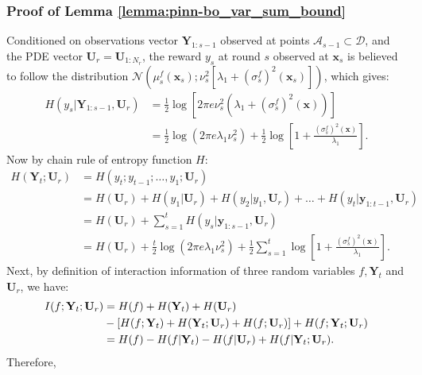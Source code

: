 \subsubsection{Proof of Lemma \ref{lemma:pinn-bo_var_sum_bound}}
Conditioned on observations vector $\mathbf{Y}_{1:s-1}$  observed at points $\mathcal{A}_{s-1} \subset \mathcal{D}$, and the PDE vector $\mathbf{U}_r = \mathbf{U}_{1:N_r}$, the reward $y_s$ at round $s$ observed at
$\mathbf{x}_s$ is believed to follow the distribution $\mathcal{N}\left(\mu_s^f(\mathbf{x}_s); \nu_s^2[\lambda_1 + \left(\sigma_s^f\right)^2(\mathbf{x}_s)]\right)$, which gives:
\begin{align*}
H(y_s \rvert \mathbf{Y}_{1:s-1}, \mathbf{U}_r) &= \frac{1}{2} \log\left[ 2\pi e \nu_s^2\left(\lambda_1 + \left(\sigma_s^f\right)^2(\mathbf{x}) \right) \right]\\
&=\frac{1}{2}\log(2\pi e \lambda_1\nu_s^2) + \frac{1}{2} \log \left[1+ \frac{\left(\sigma_s^f\right)^2(\mathbf{x})}{\lambda_1}\right].
\end{align*}
Now by chain rule of entropy function $H$: 
\begin{align}
    H(\mathbf{Y}_t; \mathbf{U}_r) &= H(y_t; y_{t-1};\dots, y_1; \mathbf{U}_r) \nonumber
    \\
    &= H(\mathbf{U}_r) + H(y_1 \rvert \mathbf{U}_r) + H(y_2\rvert y_1, \mathbf{U}_r) + \dots + H (y_t \rvert \mathbf{y}_{1:t-1}, \mathbf{U}_r) \nonumber
    \\
    &= H(\mathbf{U}_r) + \sum_{s=1}^t H(y_s \rvert \mathbf{y}_{1:s-1}, \mathbf{U}_r) \nonumber
    \\ 
    & = H(\mathbf{U}_r) + \frac{t}{2}\log(2\pi e \lambda_1\nu_s^2) + \frac{1}{2}\sum_{s=1}^t \log \left[1+ \frac{\left(\sigma_s^f\right)^2(\mathbf{x})}{\lambda_1}\right]. \label{Eqn:joint_entropy_Yt_Ur}
\end{align}
Next, by definition of interaction information of three random variables $f, \mathbf{Y}_t$ and $\mathbf{U}_r$, we have: 
    \begin{align*}
        I(f; \mathbf{Y}_t; \mathbf{U}_r) &= H(f) + H(\mathbf{Y}_t) + H(\mathbf{U}_r) \notag \\
        & - [H(f; \mathbf{Y}_t) + H(\mathbf{Y}_t; \mathbf{U}_r) + H(f; \mathbf{U}_r)] + H (f; \mathbf{Y}_t; \mathbf{U}_r)
        \\
        &= H(f) - H(f \rvert \mathbf{Y}_t) - H(f \rvert \mathbf{U}_r) + H(f \rvert \mathbf{Y}_t; \mathbf{U}_r).
    \end{align*}
    Therefore,  
